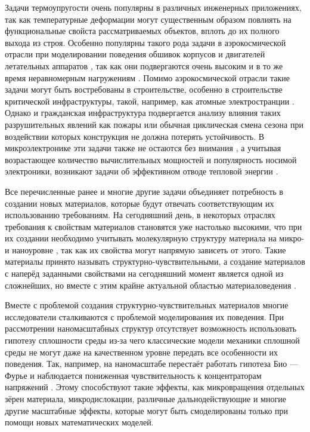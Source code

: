 
{\actuality}
Задачи термоупругости очень популярны в различных инженерных приложениях, так как температурные деформации могут существенным образом повлиять на функциональные свойста рассматриваемых объектов, вплоть до их полного выхода из строя. Особенно популярны такого рода задачи в аэрокосмической отрасли при моделировании поведения обшивок корпусов и двигателей летательных аппаратов \cite{Aerocosmos1, Aerocosmos2, Aerocosmos3}, так как они подвергаются очень высоким и в то же время неравномерным нагружениям \cite{Aerocosmos4, Aerocosmos5, Aerocosmos6, Aerocosmos7}. Помимо аэрокосмической отрасли такие задачи могут быть востребованы в строительстве, особенно в строительстве критической инфраструктуры, такой, например, как атомные электространции \cite{StroyMech1, StroyMech2}. Однако и гражданская инфраструктура подвергается анализу влияния таких разрушительных явлений как пожары \cite{StroyMech3, StroyMech4} или обычная циклическая смена сезона \cite{StroyMech5, StroyMech6} при воздействии которых конструкция не должна потерять устойчивость. В микроэлектронике эти задачи также не остаются без внимания \cite{MicroElectronic1, MicroElectronic2}, а учитывая возрастающее количество вычислительных мощностей и популярность носимой электроники, возникают задачи об эффективном отводе тепловой энергии \cite{MicroElectronic3}.

Все перечисленные ранее и многие другие задачи объединяет потребность в создании новых материалов, которые будут отвечать соответствующим их использованию требованиям. На сегодняшний день, в некоторых отраслях требования к свойствам материалов становятся уже настолько высокими, что при их создании необходимо учитывать молекулярную структуру материала на микро- и наноуровне \cite{MaterialStructure1, MaterialStructure2, MaterialStructure3}, так как их свойства могут напрямую зависеть от этого. Такие материалы принято называть структурно-чувствительными, а создание материалов с наперёд заданными свойствами на сегодняшний момент является одной из сложнейших, но вместе с этим крайне актуальной областью материаловедения \cite{Auxetics}.

Вместе с проблемой создания структурно-чувствительных материалов многие исследователи сталкиваются с проблемой моделирования их поведения. При рассмотрении наномасштабных структур отсутствует возможность использовать гипотезу сплошности среды из-за чего классические модели механики сплошной среды не могут даже на качественном уровне передать все особенности их поведения. Так, например, на наномасштабе перестаёт работать гипотеза Био --- Фурье \cite{FourierLaw1, FourierLaw2} и наблюдается пониженная чувствительность к концентраторам напряжений \cite{ConcentrationInsensitive1, ConcentrationInsensitive2}. Этому способствуют такие эффекты, как микровращения отдельных зёрен материала, микродислокации, различные дальнодействующие и многие другие масштабные эффекты, которые могут быть смоделированы только при помощи новых математических моделей.


